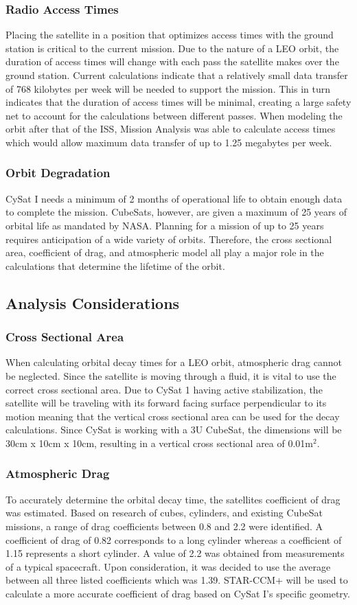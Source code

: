 \documentclass[nocover]            %
{CSLI}                       %
\begin{document}
\subsubsection{Radio Access Times}
Placing the satellite in a position that optimizes access times with the ground station is critical to the current mission. Due to the nature of a LEO orbit, the duration of access times will change with each pass the satellite makes over the ground station. Current calculations indicate that a relatively small data transfer of 768 kilobytes per week will be needed to support the mission. This in turn indicates that the duration of access times will be minimal, creating a large safety net to account for the calculations between different passes. When modeling the orbit after that of the ISS, Mission Analysis was able to calculate access times which would allow maximum data transfer of up to 1.25 megabytes per week. 
\subsubsection{Orbit Degradation} 
CySat I needs a minimum of 2 months of operational life to obtain enough data to complete the mission. CubeSats, however, are given a maximum of 25 years of orbital life as mandated by NASA. Planning for a mission of up to 25 years requires anticipation of a wide variety of orbits. Therefore, the cross sectional area, coefficient of drag, and atmospheric model all play a major role in the calculations that determine the lifetime of the orbit.
\subsection{Analysis Considerations}
\subsubsection{Cross Sectional Area}
When calculating orbital decay times for a LEO orbit, atmospheric drag cannot be neglected. Since the satellite is moving through a fluid, it is vital to use the correct cross sectional area. Due to CySat 1 having active stabilization, the satellite will be traveling with its forward facing surface perpendicular to its motion meaning that the vertical cross sectional area can be used for the decay calculations. Since CySat is working with a 3U CubeSat, the dimensions will be 30cm x 10cm x 10cm, resulting in a vertical cross sectional area of 0.01m$^2$.
\subsubsection{Atmospheric Drag}
To accurately determine the orbital decay time, the satellites coefficient of drag was estimated. Based on research of cubes, cylinders, and existing CubeSat missions, a range of drag coefficients between 0.8 and 2.2 were identified. A coefficient of drag of 0.82 corresponds to a long cylinder whereas a coefficient of 1.15 represents a short cylinder. A value of 2.2 was obtained from measurements of a typical spacecraft. Upon consideration, it was decided to use the average between all three listed coefficients which was 1.39. STAR-CCM+ will be used to calculate a more accurate coefficient of drag based on CySat I's specific geometry.
\end{document}
